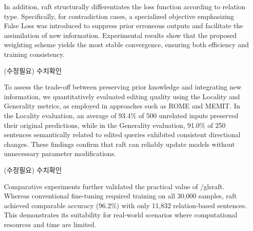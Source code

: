 \documentclass[a4paper,fleqn]{cas-sc}
\begin{document}
In addition, \gls{raft} structurally differentiates the loss function according to relation type. Specifically, for contradiction cases, a specialized objective emphasizing False Loss was introduced to suppress prior erroneous outputs and facilitate the assimilation of new information. Experimental results show that the proposed weighting scheme yields the most stable convergence, ensuring both efficiency and training consistency.

(수정필요) 수치확인

To assess the trade-off between preserving prior knowledge and integrating new information, we quantitatively evaluated editing quality using the Locality and Generality metrics, as employed in approaches such as ROME and MEMIT. In the Locality evaluation, an average of 93.4\% of 500 unrelated inputs preserved their original predictions, while in the Generality evaluation, 91.0\% of 250 sentences semantically related to edited queries exhibited consistent directional changes. These findings confirm that \gls{raft} can reliably update models without unnecessary parameter modifications.

(수정필요) 수치확인

Comparative experiments further validated the practical value of /gls{raft}. Whereas conventional fine-tuning required training on all 30,000 samples, \gls{raft} achieved comparable accuracy (96.2\%) with only 11,832 relation-based sentences. This demonstrates its suitability for real-world scenarios where computational resources and time are limited.
\end{document}

